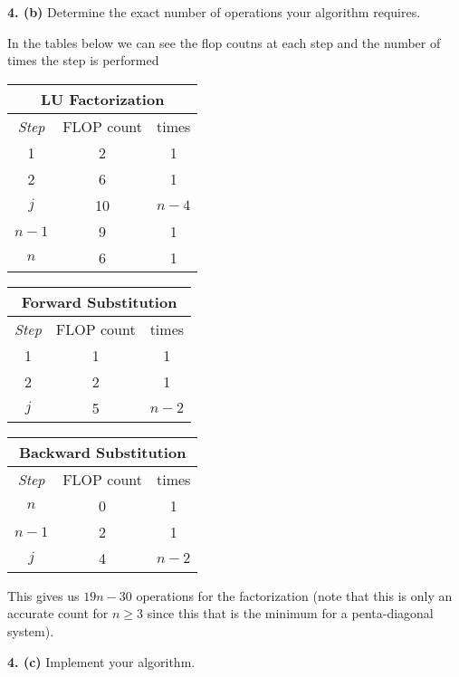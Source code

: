 \documentclass[12pt]{article}
\newcommand{\problem}[1]{\hspace{-4 ex} \large \textbf{#1}}
\begin{document}
\problem{4. (b)} Determine the exact number of operations your algorithm requires.

	In the tables below we can see the flop coutns at each step and the number of times the step is performed
	\begin{center}
		\begin{tabular}{|c|c|c|}\hline
			\multicolumn{3}{|c|}{LU Factorization} \\ \hline
			\emph{Step}&FLOP count&times \\ \hline
			1 &2 & 1 \\ \hline
			2 &6 & 1 \\ \hline
			$j$ & 10 & $n-4$ \\ \hline
			$n-1$ & 9 & 1 \\ \hline
			$n$ & 6 & 1 \\ \hline
		\end{tabular}
	\end{center}
	\begin{center}
		\begin{tabular}{|c|c|c|}\hline
			\multicolumn{3}{|c|}{Forward Substitution} \\ \hline
			\emph{Step}&FLOP count&times \\ \hline
			1 &1 & 1 \\ \hline
			2 &2 & 1 \\ \hline
			$j$ & 5 & $n-2$ \\ \hline
		\end{tabular}
	\end{center}
	\begin{center}
		\begin{tabular}{|c|c|c|}\hline
			\multicolumn{3}{|c|}{Backward Substitution} \\ \hline
			\emph{Step}&FLOP count&times \\ \hline
			$n$ &0 & 1 \\ \hline
			$n-1$ &2 & 1 \\ \hline
			$j$ & 4 & $n-2$ \\ \hline
		\end{tabular}
	\end{center}
	This gives us $19n-30$ operations for the factorization (note that this is only an accurate count for $n \geq 3$ since this that is the minimum for a penta-diagonal system).
	
\problem{4. (c)} Implement your algorithm. \\
\end{document}
